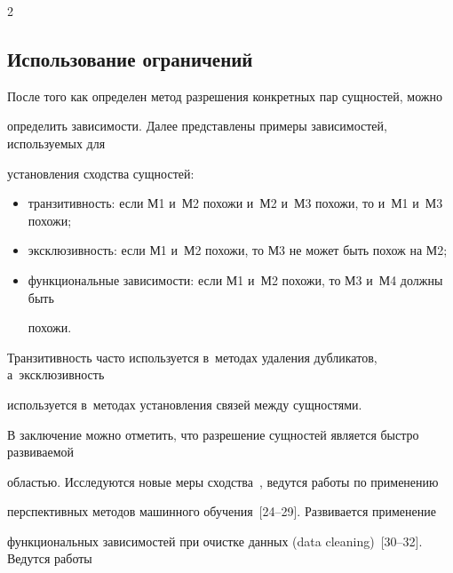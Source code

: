 \begin{multicols}{2}
\begin{figure}[b]
\begin{center}
{ 

 }

 \end{center}

 \vspace*{-9pt}


\end{figure}





  \subsection{Использование ограничений} %



  После того как определен метод разрешения конкретных пар сущностей, можно

определить зависимости. Далее представлены примеры зависимостей, используемых для

установления сходства сущностей:

  \begin{itemize}

\item транзитивность: если М1 и~М2 похожи и~М2 и~М3 похожи, то и~М1 и~М3 похожи;

\item эксклюзивность: если М1 и~М2 похожи, то М3 не может быть похож на М2;

\item функциональные зависимости: если М1 и~М2 похожи, то М3 и~М4 должны быть

похожи.

\end{itemize}



  Транзитивность часто используется в~методах удаления дубликатов, а~эксклюзивность

используется в~методах установления связей между сущностями.



  В заключение можно отметить, что разрешение сущностей является быстро развиваемой

областью. Исследуются новые меры сходства~\cite{14-vov}, ведутся работы по применению

перспективных методов машинного обучения~[24--29]. Развивается применение

функциональных зависимостей при очистке данных (data cleaning)~[30--32]. Ведутся работы


\end{multicols}
